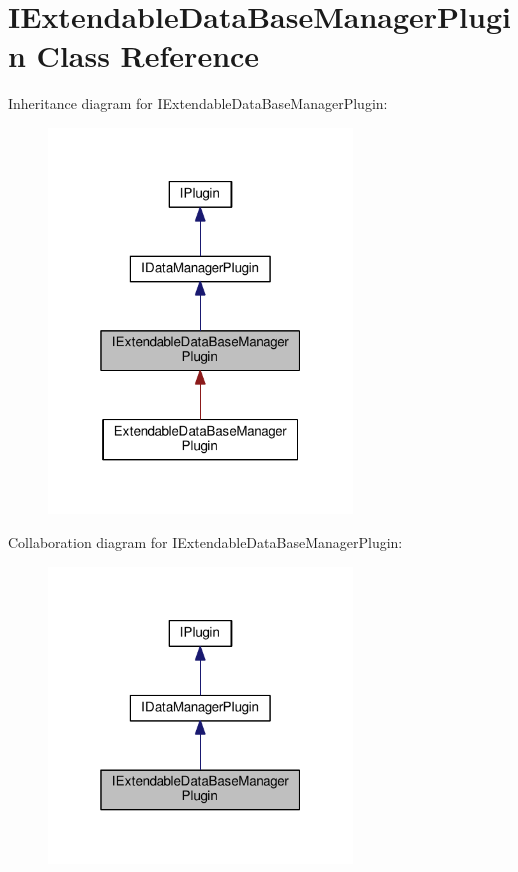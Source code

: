 \hypertarget{class_i_extendable_data_base_manager_plugin}{}\section{I\+Extendable\+Data\+Base\+Manager\+Plugin Class Reference}
\label{class_i_extendable_data_base_manager_plugin}


Inheritance diagram for I\+Extendable\+Data\+Base\+Manager\+Plugin\+:\nopagebreak
\begin{figure}[H]
\begin{center}
\leavevmode
\includegraphics[width=229pt]{class_i_extendable_data_base_manager_plugin__inherit__graph}
\end{center}
\end{figure}


Collaboration diagram for I\+Extendable\+Data\+Base\+Manager\+Plugin\+:\nopagebreak
\begin{figure}[H]
\begin{center}
\leavevmode
\includegraphics[width=229pt]{class_i_extendable_data_base_manager_plugin__coll__graph}
\end{center}
\end{figure}

